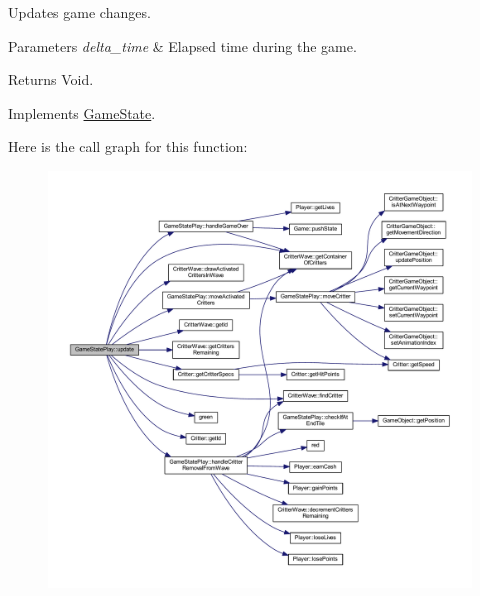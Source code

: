 Updates game changes. 


\begin{DoxyParams}{Parameters}
{\em delta\+\_\+time} & Elapsed time during the game. \\
\hline
\end{DoxyParams}
\begin{DoxyReturn}{Returns}
Void. 
\end{DoxyReturn}


Implements \hyperlink{class_game_state_ad331d02d3989271b8cbc88fcb1448959}{Game\+State}.



Here is the call graph for this function\+:
\nopagebreak
\begin{figure}[H]
\begin{center}
\leavevmode
\includegraphics[width=350pt]{class_game_state_play_a2faf041a447ddf86726658455560abb8_cgraph}
\end{center}
\end{figure}




